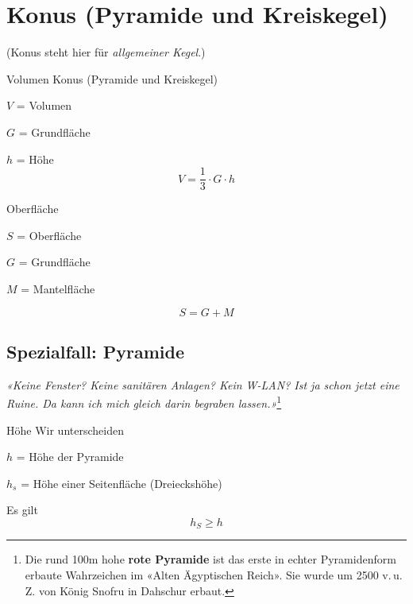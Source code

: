 \section{Konus (Pyramide und Kreiskegel)}

(Konus steht hier für \textit{allgemeiner Kegel}.)



\begin{gesetz}{Volumen Konus (Pyramide und Kreiskegel)}{}
  
  $V$ = Volumen
  
  $G$ = Grundfläche

  $h$ = Höhe
  $$V = \frac13\cdot{}G\cdot{}h$$
\end{gesetz}

\begin{gesetz}{Oberfläche}{}

  $S$ = Oberfläche

  $G$ = Grundfläche

  $M$ = Mantelfläche

  $$S = G + M$$
  \end{gesetz}
\newpage

\subsection{Spezialfall: Pyramide}


\begin{center}
{\textit{«Keine Fenster? Keine sanitären Anlagen? Kein W-LAN? Ist ja schon
jetzt eine Ruine. Da kann ich mich gleich darin begraben
lassen.»}}\footnote{Die rund 100m hohe \textbf{rote Pyramide} ist das
  erste in echter Pyramidenform erbaute Wahrzeichen im «Alten
  Ägyptischen Reich». Sie wurde um 2500 v.\,u.\,Z. von König Snofru in
Dahschur erbaut.}
\end{center}


\begin{bemerkung}{Höhe}{}
  Wir unterscheiden

  $h$ = Höhe der Pyramide

  $h_s$ = Höhe einer Seitenfläche (Dreieckshöhe)
\end{bemerkung}
\begin{gesetz}{}{}
  Es gilt
  $$h_S \ge h$$
  \end{gesetz}
\newpage
